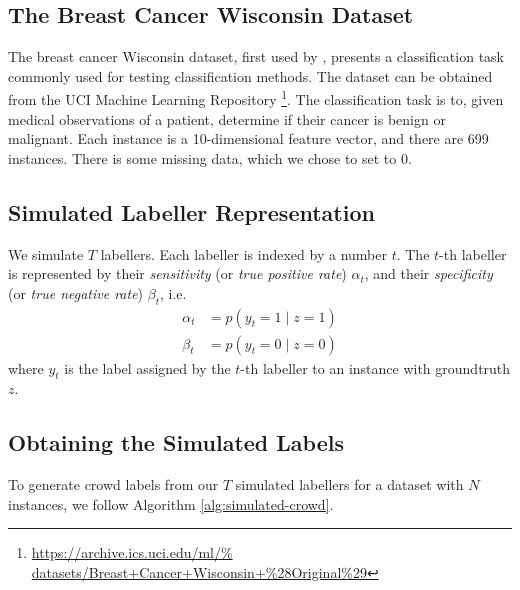     \subsection{The Breast Cancer Wisconsin Dataset}
    \label{sec:breast-dataset}

        \raggedbottom

        The breast cancer Wisconsin dataset, first used by \citet{wolberg90},
        presents a classification task commonly used for testing classification
        methods. The dataset can be obtained from the UCI Machine Learning
        Repository \citep{lichman13}
        \footnote{\url{https://archive.ics.uci.edu/ml/%
                       datasets/Breast+Cancer+Wisconsin+\%28Original\%29}}.
        The classification task is to, given medical observations of a patient,
        determine if their cancer is benign or malignant. Each instance is a
        10-dimensional feature vector, and there are 699 instances. There is
        some missing data, which we chose to set to 0.

    \subsection{Simulated Labeller Representation}
    \label{sec:simulated-labellers}

        We simulate $T$ labellers. Each labeller is indexed by a number $t$. The
        $t$-th labeller is represented by their \emph{sensitivity} (or \emph{true
        positive rate}) $\alpha_t$, and their \emph{specificity} (or \emph{true
        negative rate}) $\beta_t$, i.e.
        \begin{align*}
            \alpha_t &= p(y_t = 1 \mid z = 1)\\
            \beta_t &= p(y_t = 0 \mid z = 0)
        \end{align*}
        where $y_t$ is the label assigned by the $t$-th labeller to an instance
        with groundtruth $z$.

    \subsection{Obtaining the Simulated Labels}
    \label{sec:obtaining-simulated-labels}

        To generate crowd labels from our $T$ simulated labellers for a dataset
        with $N$ instances, we follow Algorithm \ref{alg:simulated-crowd}.

